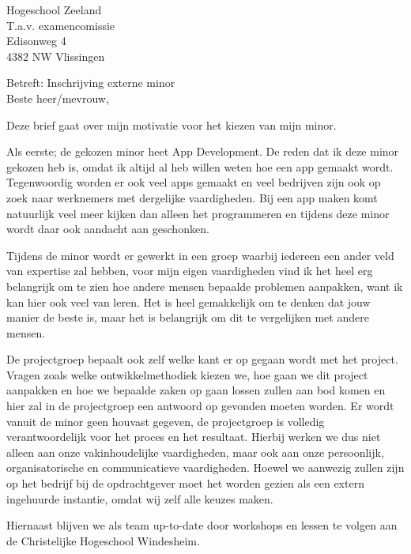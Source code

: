 \documentclass{letter}
\begin{document}
\begin{letter}{Hogeschool Zeeland \\ T.a.v. examencomissie \\ Edisonweg 4 \\ 4382 NW Vlissingen}

\opening{Betreft: Inschrijving externe minor \newline \\ Beste heer/mevrouw,}

Deze brief gaat over mijn motivatie voor het kiezen van mijn minor.

Als eerste; de gekozen minor heet App Development. De reden dat ik deze minor gekozen heb is, omdat ik altijd al heb willen weten hoe een app gemaakt wordt. Tegenwoordig worden er ook veel apps gemaakt en veel bedrijven zijn ook op zoek naar werknemers met dergelijke vaardigheden. Bij een app maken komt natuurlijk veel meer kijken dan alleen het programmeren en tijdens deze minor wordt daar ook aandacht aan geschonken.

\newline

Tijdens de minor wordt er gewerkt in een groep waarbij iedereen een ander veld van expertise zal hebben, voor mijn eigen vaardigheden vind ik het heel erg belangrijk om te zien hoe andere mensen bepaalde problemen aanpakken, want ik kan hier ook veel van leren. Het is heel gemakkelijk om te denken dat jouw manier de beste is, maar het is belangrijk om dit te vergelijken met andere mensen. 

De projectgroep bepaalt ook zelf welke kant er op gegaan wordt met het project. Vragen zoals welke ontwikkelmethodiek kiezen we, hoe gaan we dit project aanpakken en hoe we bepaalde zaken op gaan lossen zullen aan bod komen en hier zal in de projectgroep een antwoord op gevonden moeten worden. Er wordt vanuit de minor geen houvast gegeven, de projectgroep is volledig verantwoordelijk voor het proces en het resultaat. Hierbij werken we dus niet alleen aan onze vakinhoudelijke vaardigheden, maar ook aan onze persoonlijk, organisatorische en communicatieve vaardigheden. Hoewel we aanwezig zullen zijn op het bedrijf bij de opdrachtgever moet het worden gezien als een extern ingehuurde instantie, omdat wij zelf alle keuzes maken. 

Hiernaast blijven we als team up-to-date door workshops en lessen te volgen aan de Christelijke Hogeschool Windesheim.

\newline


\end{letter}
\end{document}
